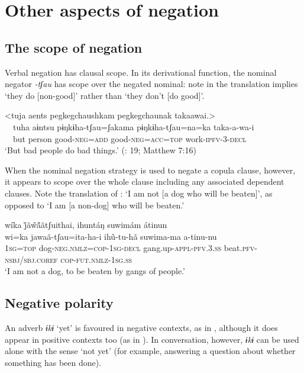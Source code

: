 \documentclass[output=paper,colorlinks,citecolor=brown,draft]{langscibook}
\begin{document}
\section{Other aspects of negation}\label{sec:agu:4}
\subsection{The scope of negation}\label{sec:agu:4.1}

Verbal negation has clausal scope. In its derivational function, the nominal negator \textit{{}-tʃau} has scope over the negated nominal: note in  the translation implies ‘they do [non-good]' rather than ‘they don’t [do good]'.

\ea\label{ex:agu:55}
    \glll <tuja aents pegkegchaushkam pegkegchaunak takaawai.> \\ 
          ~~tuha  aɨntsu  pɨŋkɨha-tʃau=ʃakama  pɨŋkɨha-tʃau=na=ka  taka-a-wa-i\\
          ~~but  person  good-\textsc{neg=add}  good-\textsc{neg=acc=top}  work-\textsc{ipfv-3-decl}\\
    \glt ‘But bad people do bad things.’ (\citealt{LigaBíblica2008}: 19; Matthew 7:16)
\z 

When the nominal negation strategy is used to negate a copula clause, however, it appears to scope over the whole clause including any associated dependent clauses. Note the translation of : ‘I am not [a dog who will be beaten]', as opposed to ‘I am [a non-dog] who will be beaten.'

\ea\label{ex:agu:56}
    \glll wíka j̃ãw̃ã́ãtʃuithai, ihuntáŋ suwimám átinun \\ 
          wi=ka  jawaã-tʃau=ita-ha-i  ih\~u-tu-hã suwima-ma  a-tinu-nu\\
          \textsc{1sg}=\textsc{top}  dog-\textsc{neg.nmlz=cop-1sg-decl}  gang.up-\textsc{appl-pfv.3.ss} beat.\textsc{pfv-nsbj/sbj.coref}  \textsc{cop-fut.nmlz-1sg.ss} \\
    \glt ‘I am not a dog, to be beaten by gangs of people.’ \citep[406]{Overall2017a}
\z 

\subsection{Negative polarity}\label{sec:agu:4.2}

An adverb \textit{ɨkɨ} ‘yet’ is favoured in negative contexts, as in , although it does appear in positive contexts too (as in ). In conversation, however, \textit{ɨkɨ} can be used alone with the sense ‘not yet’ (for example, answering a question about whether something has been done).
\end{document}
